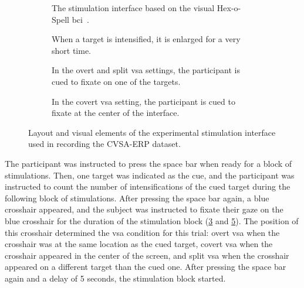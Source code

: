 \begin{figure}
  \begin{subfigure}[t]{.45\textwidth}
    
    \caption[The stimulation interface.]{The stimulation interface based on the visual Hex-o-Spell
    \acs{bci}~\cite{Treder2010}.}%
    \label{fig:covert-align/interface/interface}
  \end{subfigure}\hfill%
  \begin{subfigure}[t]{.45\textwidth}
    
    \caption[Intensification.]{When a target is intensified, it is enlarged for
    a very short time.}%
    \label{fig:covert-align/interface/intensification}
  \end{subfigure}

  \begin{subfigure}[t]{.45\textwidth}
    
    \caption[Gaze fixated on a target.]{In the overt and split \ac{vsa}
    settings, the
    participant is cued to fixate on one of the targets.}%
    \label{fig:covert-align/interface/overt}
  \end{subfigure}\hfill%
  \begin{subfigure}[t]{.45\textwidth}
    
    \caption[Gaze fixated centrally.]{In the covert \ac{vsa} setting, the participant is
    cued to fixate at the center of the interface.}%
    \label{fig:covert-align/interface/covert}
  \end{subfigure}
  \caption[Stimulation interface layout.]{Layout and visual elements of the experimental stimulation
  interface used in recording the CVSA-ERP dataset.}
\end{figure}

The participant was instructed to press the space bar when ready for a block
of stimulations.
Then, one target was indicated as the cue, and the participant
was instructed to count the number of intensifications of the cued target
during the following block of stimulations.
After pressing the space bar again, a blue crosshair appeared, and the subject
was instructed to fixate their gaze on the blue crosshair for the duration of
the stimulation block (\cref{fig:covert-align/interface/overt} and
\cref{fig:covert-align/interface/covert}).
The position of this crosshair determined the \ac{vsa} condition for this trial:
overt \ac{vsa} when the crosshair was at the same location as the cued target,
covert \ac{vsa} when the crosshair appeared in the center of the screen, and split
\ac{vsa} when the crosshair appeared on a different target than the cued one.
After pressing the space bar again and a delay of 5 seconds, the stimulation block
started.

